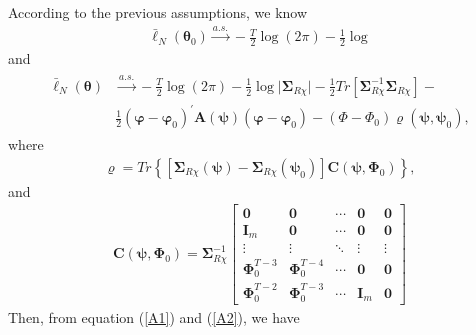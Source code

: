 \documentclass[12pt,a4paper,hyperref]{article}
\begin{document}
According to the previous assumptions, we know
\begin{align}
\bar{\ell}_{N}(\boldsymbol{\theta}_{0})\overset{a.s.}{\to} -\frac{T}{2}\log (2\pi)-\frac{1}{2} \log
\end{align}
and
\begin{align}
\begin{split}
\bar{\ell}_{N}(\boldsymbol{\theta}) &\overset{a.s.}{\to} -\frac{T}{2}\log(2 \pi)-\frac{1}{2} \log \vert \boldsymbol{\Sigma}_{R \chi} \vert-\frac{1}{2} Tr \left[ \boldsymbol{\Sigma}_{R \chi}^{-1}\boldsymbol{\Sigma}_{R \chi} \right]- \\
&\frac{1}{2} \left( \boldsymbol{\varphi}- \boldsymbol{\varphi}_{0} \right)^{'}\boldsymbol{A}\left(\boldsymbol{\psi}\right) \left(\boldsymbol{\varphi}- \boldsymbol{\varphi}_{0}\right)-\left( \Phi-\Phi_{0}  \right)\varrho(\boldsymbol{\psi}, \boldsymbol{\psi}_{0}),\label{A2}
\end{split}
\end{align}
where
\begin{align}
\varrho=Tr \left\lbrace  \left[\boldsymbol{\Sigma}_{R \chi}(\boldsymbol{\psi})-\boldsymbol{\Sigma}_{R \chi}(\boldsymbol{\psi}_{0}) \right]\boldsymbol{C}\left(\boldsymbol{\psi}, \boldsymbol{\Phi}_{0} \right) \right\rbrace ,
\end{align}
and
\begin{align}
\boldsymbol{C}(\boldsymbol{\psi}, \boldsymbol{\Phi}_{0})=\boldsymbol{\Sigma}_{R \chi}^{-1}
\begin{bmatrix}
\boldsymbol{0}                                 & \boldsymbol{0}                   & \cdots         &\boldsymbol{0}  & \boldsymbol{0} \\
\boldsymbol{I}_{m}                        &\boldsymbol{0}                        &  \cdots     & \boldsymbol{0}  &\boldsymbol{0}  \\
\vdots                                            &       \vdots                                & \ddots       & \vdots              & \vdots \\
\boldsymbol{\Phi}^{T-3}_{0}             &  \boldsymbol{\Phi}^{T-4}_{0}   & \cdots   & \boldsymbol{0}   & \boldsymbol{0} \\
\boldsymbol{\Phi}^{T-2}_{0}            &  \boldsymbol{\Phi}^{T-3}_{0}   & \cdots   & \boldsymbol{I}_{m} & \boldsymbol{0}
\end{bmatrix}
\end{align}
Then, from equation (\ref{A1}) and (\ref{A2}), we have
\end{document}
